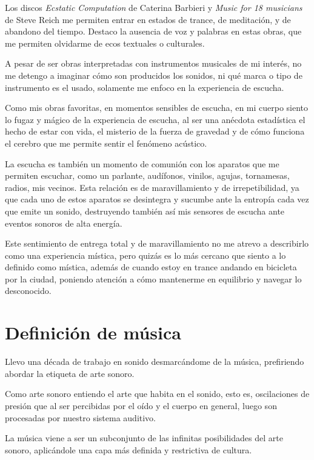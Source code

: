 \documentclass{article}
\begin{document}
Los discos \textit{Ecstatic Computation} de Caterina Barbieri y \textit{Music for 18 musicians} de Steve Reich me permiten entrar en estados de trance, de meditación, y de abandono del tiempo. Destaco la ausencia de voz y palabras en estas obras, que me permiten olvidarme de ecos textuales o culturales.

A pesar de ser obras interpretadas con instrumentos musicales de mi interés, no me detengo a imaginar cómo son producidos los sonidos, ni qué marca o tipo de instrumento es el usado, solamente me enfoco en la experiencia de escucha.

Como mis obras favoritas, en momentos sensibles de escucha, en mi cuerpo siento lo fugaz y mágico de la experiencia de escucha, al ser una anécdota estadística el hecho de estar con vida, el misterio de la fuerza de gravedad y de cómo funciona el cerebro que me permite sentir el fenómeno acústico.

La escucha es también un momento de comunión con los aparatos que me permiten escuchar, como un parlante, audífonos, vinilos, agujas, tornamesas, radios, mis vecinos. Esta relación es de maravillamiento y de irrepetibilidad, ya que cada uno de estos aparatos se desintegra y sucumbe ante la entropía cada vez que emite un sonido, destruyendo también así mis sensores de escucha ante eventos sonoros de alta energía.

Este sentimiento de entrega total y de maravillamiento no me atrevo a describirlo como una experiencia mística, pero quizás es lo más cercano que siento a lo definido como mística, además de cuando estoy en trance andando en bicicleta por la ciudad, poniendo atención a cómo mantenerme en equilibrio y navegar lo desconocido.

\clearpage

\section{Definición de música}

Llevo una década de trabajo en sonido desmarcándome de la música, prefiriendo abordar la etiqueta de arte sonoro.

Como arte sonoro entiendo el arte que habita en el sonido, esto es, oscilaciones de presión que al ser percibidas por el oído y el cuerpo en general, luego son procesadas por nuestro sistema auditivo.

La música viene a ser un subconjunto de las infinitas posibilidades del arte sonoro, aplicándole una capa más definida y restrictiva de cultura.
\end{document}
